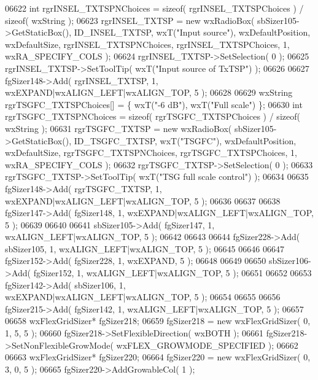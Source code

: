 \begin{DoxyCode}
06622     \textcolor{keywordtype}{int} rgrINSEL\_TXTSPNChoices = \textcolor{keyword}{sizeof}( rgrINSEL\_TXTSPChoices ) / \textcolor{keyword}{sizeof}( wxString );
06623     rgrINSEL_TXTSP = \textcolor{keyword}{new} wxRadioBox( sbSizer105->GetStaticBox(), ID_INSEL_TXTSP, wxT(\textcolor{stringliteral}{"Input source"}), 
      wxDefaultPosition, wxDefaultSize, rgrINSEL\_TXTSPNChoices, rgrINSEL\_TXTSPChoices, 1, wxRA\_SPECIFY\_COLS );
06624     rgrINSEL_TXTSP->SetSelection( 0 );
06625     rgrINSEL_TXTSP->SetToolTip( wxT(\textcolor{stringliteral}{"Input source of TxTSP"}) );
06626     
06627     fgSizer148->Add( rgrINSEL_TXTSP, 1, wxEXPAND|wxALIGN\_LEFT|wxALIGN\_TOP, 5 );
06628     
06629     wxString rgrTSGFC\_TXTSPChoices[] = \{ wxT(\textcolor{stringliteral}{"-6 dB"}), wxT(\textcolor{stringliteral}{"Full scale"}) \};
06630     \textcolor{keywordtype}{int} rgrTSGFC\_TXTSPNChoices = \textcolor{keyword}{sizeof}( rgrTSGFC\_TXTSPChoices ) / \textcolor{keyword}{sizeof}( wxString );
06631     rgrTSGFC_TXTSP = \textcolor{keyword}{new} wxRadioBox( sbSizer105->GetStaticBox(), ID_TSGFC_TXTSP, wxT(\textcolor{stringliteral}{"TSGFC"}), 
      wxDefaultPosition, wxDefaultSize, rgrTSGFC\_TXTSPNChoices, rgrTSGFC\_TXTSPChoices, 1, wxRA\_SPECIFY\_COLS );
06632     rgrTSGFC_TXTSP->SetSelection( 0 );
06633     rgrTSGFC_TXTSP->SetToolTip( wxT(\textcolor{stringliteral}{"TSG full scale control"}) );
06634     
06635     fgSizer148->Add( rgrTSGFC_TXTSP, 1, wxEXPAND|wxALIGN\_LEFT|wxALIGN\_TOP, 5 );
06636     
06637     
06638     fgSizer147->Add( fgSizer148, 1, wxEXPAND|wxALIGN\_LEFT|wxALIGN\_TOP, 5 );
06639     
06640     
06641     sbSizer105->Add( fgSizer147, 1, wxALIGN\_LEFT|wxALIGN\_TOP, 5 );
06642     
06643     
06644     fgSizer228->Add( sbSizer105, 1, wxALIGN\_LEFT|wxALIGN\_TOP, 5 );
06645     
06646     
06647     fgSizer152->Add( fgSizer228, 1, wxEXPAND, 5 );
06648     
06649     
06650     sbSizer106->Add( fgSizer152, 1, wxALIGN\_LEFT|wxALIGN\_TOP, 5 );
06651     
06652     
06653     fgSizer142->Add( sbSizer106, 1, wxEXPAND|wxALIGN\_LEFT|wxALIGN\_TOP, 5 );
06654     
06655     
06656     fgSizer215->Add( fgSizer142, 1, wxALIGN\_LEFT|wxALIGN\_TOP, 5 );
06657     
06658     wxFlexGridSizer* fgSizer218;
06659     fgSizer218 = \textcolor{keyword}{new} wxFlexGridSizer( 0, 1, 5, 5 );
06660     fgSizer218->SetFlexibleDirection( wxBOTH );
06661     fgSizer218->SetNonFlexibleGrowMode( wxFLEX\_GROWMODE\_SPECIFIED );
06662     
06663     wxFlexGridSizer* fgSizer220;
06664     fgSizer220 = \textcolor{keyword}{new} wxFlexGridSizer( 0, 3, 0, 5 );
06665     fgSizer220->AddGrowableCol( 1 );

\end{DoxyCode}
